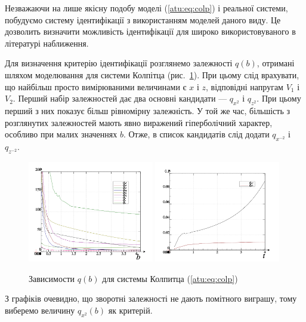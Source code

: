 Незважаючи на лише якісну подобу моделі (\ref{atu:eq:colp}) і реальної
системи, побудуємо систему ідентифікації з використанням
моделей даного виду. Це дозволить визначити можливість
ідентифікації для широко використовуваного в літературі
наближення.

Для визначення критерію ідентифікації розглянемо залежності
$q(b)$, отримані шляхом моделювання для системи Колпітца
(рис.~\ref{atu:f:colp_q}). При цьому слід врахувати, що найбільш просто
вимірюваними величинами є
$x$ і $z$, відповідні напругам
$ V_1 $ і $ V_2 $. Перший набір залежностей дає два основні кандидати ---
$ q_{x^2} $ і $ q_{z^2} $.
При цьому перший з них показує більш рівномірну
залежність. У той же час, більшість з розглянутих залежностей
мають явно виражений гіперболічний характер, особливо при
малих значеннях
$ b $. Отже, в список кандидатів слід додати
$ q_{x^{-2}} $ і $ q_{z^{-2}} $.

\begin{figure}[htb!]
\centerline{
  \includegraphics[width=0.49\textwidth]{p/mod/colp_p-p_b_e.png}
  \includegraphics[width=0.49\textwidth]{p/mod/colp_p-p_b_1ex2.png}
}
  \caption{Зависимости $q(b) $ для системы Колпитца (\ref{atu:eq:colp})}
\label{atu:f:colp_q}
\end{figure}

З графіків очевидно, що зворотні залежності не дають помітного
виграшу, тому виберемо величину
$ q_{x^2} (b) $ як критерій.


